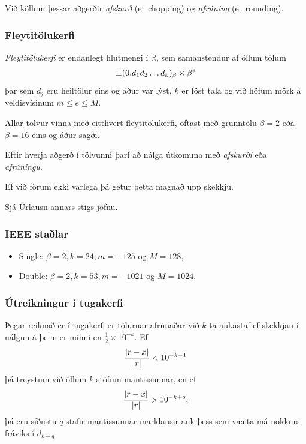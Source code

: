 \documentclass[a4paper,10pt,icelandic]{sphinxmanual}
\begin{document}
Við köllum þessar aðgerðir \emph{afskurð} (e. chopping) og \emph{afrúning}
(e. rounding).


\subsubsection{Fleytitölukerfi}
\label{kafli01:fleytitolukerfi}
\emph{Fleytitölukerfi} er endanlegt hlutmengi í \({\mathbb  R}\), sem
samanstendur af öllum tölum
\begin{gather}
\begin{split}\pm (0.d_1d_2\dots d_k)_\beta\times \beta^e\end{split}\notag
\end{gather}
þar sem \(d_j\) eru heiltölur eins og áður var lýst, \(k\) er
föst tala og við höfum mörk á veldisvísinum \(m\leq e\leq M\).

Allar tölvur vinna með eitthvert fleytitölukerfi, oftast með grunntölu
\(\beta=2\) eða \(\beta=16\) eins og áður sagði.

Eftir hverja aðgerð í tölvunni þarf að nálga útkomuna með \emph{afskurði} eða
\emph{afrúningu}.

Ef við förum ekki varlega þá getur þetta magnað upp skekkju.

Sjá {\hyperref[kafli01:urlausn-annars-stigs-jofnu]{Úrlausn annars stigs jöfnu}}.


\subsubsection{IEEE staðlar}
\label{kafli01:ieee-stalar}\begin{itemize}
\item {} 
Single: \(\beta = 2, k=24, m=-125\) og \(M = 128\),

\item {} 
Double: \(\beta = 2, k=53, m=-1021\) og \(M = 1024\).

\end{itemize}


\subsubsection{Útreikningur í tugakerfi}
\label{kafli01:utreikningur-i-tugakerfi}
Þegar reiknað er í tugakerfi er tölurnar afrúnaðar við \(k\)-ta
aukastaf ef skekkjan í nálgun á þeim er minni en
\(\frac 12\times 10^{-k}\). Ef
\begin{gather}
\begin{split}\dfrac{|r-x|}{|r|}<10^{-k-1}\end{split}\notag
\end{gather}
þá treystum við öllum \(k\) stöfum mantissunnar, en ef
\begin{gather}
\begin{split}\dfrac{|r-x|}{|r|}>10^{-k+q},\end{split}\notag
\end{gather}
þá eru síðustu \(q\) stafir mantissunnar marklausir auk þess sem
vænta má nokkurs fráviks í \(d_{k-q}\).
\end{document}
